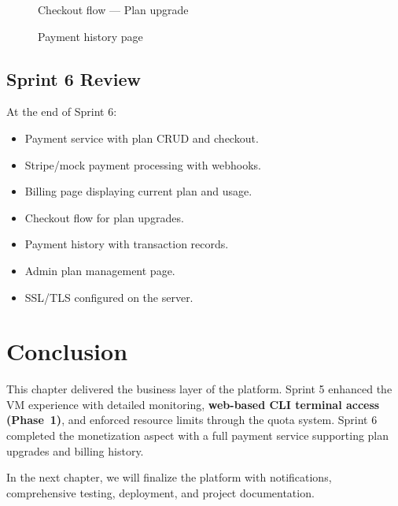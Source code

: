 \begin{figure}[H]
\centering
{}
\caption{Checkout flow — Plan upgrade}
\label{fig:checkout}
\end{figure}

\begin{figure}[H]
\centering
{}
\caption{Payment history page}
\label{fig:payment-history}
\end{figure}

\subsection{Sprint 6 Review}

At the end of Sprint 6:
\begin{itemize}
  \item Payment service with plan CRUD and checkout.
  \item Stripe/mock payment processing with webhooks.
  \item Billing page displaying current plan and usage.
  \item Checkout flow for plan upgrades.
  \item Payment history with transaction records.
  \item Admin plan management page.
  \item SSL/TLS configured on the server.
\end{itemize}

\section{Conclusion}

This chapter delivered the business layer of the platform. Sprint 5 enhanced the VM experience with detailed monitoring, \textbf{web-based CLI terminal access (Phase~1)}, and enforced resource limits through the quota system. Sprint 6 completed the monetization aspect with a full payment service supporting plan upgrades and billing history.

In the next chapter, we will finalize the platform with notifications, comprehensive testing, deployment, and project documentation.
